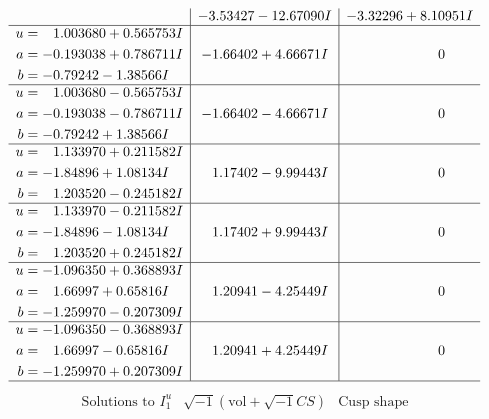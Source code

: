 \documentclass[1p]{elsarticle_modified}
\theoremstyle{definition}
\newcommand{\I}{\sqrt{-1}}
\begin{document}
$$\begin{array}{c|c|c}
 & -3.53427 - 12.67090 I & -3.32296 + 8.10951 I \\ \hline\begin{aligned}
u &= \phantom{-}1.003680 + 0.565753 I \\
a &= -0.193038 + 0.786711 I \\
b &= -0.79242 - 1.38566 I\end{aligned}
 & -1.66402 + 4.66671 I & \phantom{-0.000000 } 0 \\ \hline\begin{aligned}
u &= \phantom{-}1.003680 - 0.565753 I \\
a &= -0.193038 - 0.786711 I \\
b &= -0.79242 + 1.38566 I\end{aligned}
 & -1.66402 - 4.66671 I & \phantom{-0.000000 } 0 \\ \hline\begin{aligned}
u &= \phantom{-}1.133970 + 0.211582 I \\
a &= -1.84896 + 1.08134 I \\
b &= \phantom{-}1.203520 - 0.245182 I\end{aligned}
 & \phantom{-}1.17402 - 9.99443 I & \phantom{-0.000000 } 0 \\ \hline\begin{aligned}
u &= \phantom{-}1.133970 - 0.211582 I \\
a &= -1.84896 - 1.08134 I \\
b &= \phantom{-}1.203520 + 0.245182 I\end{aligned}
 & \phantom{-}1.17402 + 9.99443 I & \phantom{-0.000000 } 0 \\ \hline\begin{aligned}
u &= -1.096350 + 0.368893 I \\
a &= \phantom{-}1.66997 + 0.65816 I \\
b &= -1.259970 - 0.207309 I\end{aligned}
 & \phantom{-}1.20941 - 4.25449 I & \phantom{-0.000000 } 0 \\ \hline\begin{aligned}
u &= -1.096350 - 0.368893 I \\
a &= \phantom{-}1.66997 - 0.65816 I \\
b &= -1.259970 + 0.207309 I\end{aligned}
 & \phantom{-}1.20941 + 4.25449 I & \phantom{-0.000000 } 0\\
 \hline 
 \end{array}$$\newpage$$\begin{array}{c|c|c}  
\text{Solutions to }I^u_{1}& \I (\text{vol} + \sqrt{-1}CS) & \text{Cusp shape}\\

\end{array}$$
\end{document}
